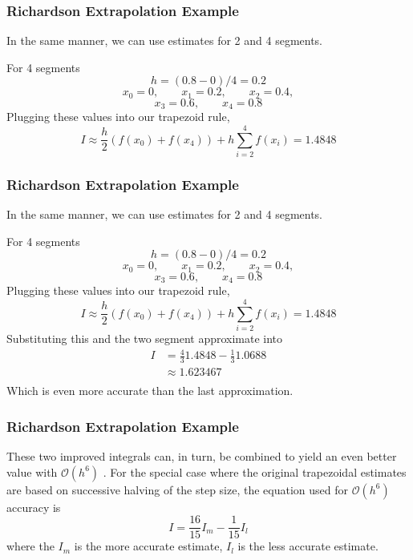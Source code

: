 \documentclass{if-beamer}
\begin{document}
\begin{frame}[t]
	\frametitle{Richardson Extrapolation Example}
	
	In the same manner, we can use estimates for 2 and 4 segments. \\\vspace{10pt}
	
	For 4 segments
	$$ h = (0.8-0)/4 = 0.2$$
	$$ x_0 = 0, \qquad x_1 = 0.2, \qquad x_2 = 0.4,$$
	$$ x_3 = 0.6, \qquad x_4 =0.8 $$
	Plugging these values into our trapezoid rule, 
	$$ I \approx \frac{h}{2}(f(x_0)+f(x_4)) + h\sum_{i=2}^{4} f(x_i) = 1.4848$$

\end{frame}

\begin{frame}[t]
	\frametitle{Richardson Extrapolation Example}
	
	In the same manner, we can use estimates for 2 and 4 segments. \\\vspace{10pt}
	
	For 4 segments
	$$ h = (0.8-0)/4 = 0.2$$
	$$ x_0 = 0, \qquad x_1 = 0.2, \qquad x_2 = 0.4,$$
	$$ x_3 = 0.6, \qquad x_4 =0.8 $$
	Plugging these values into our trapezoid rule, 
	$$ I \approx \frac{h}{2}(f(x_0)+f(x_4)) + h\sum_{i=2}^{4} f(x_i) = 1.4848$$
	Substituting this and the two segment approximate into 
	\begin{align*}
	I &=\frac{4}{3}1.4848-\frac{1}{3}1.0688\\
	&\approx 1.623467\\
	\end{align*}
	Which is even more accurate than the last approximation.
\end{frame}

\begin{frame}[t]
	\frametitle{Richardson Extrapolation Example}
	These two improved integrals can, in turn, be combined to yield an
	even better value with $\mathcal{O}(h^6)$ . For the special case where the original trapezoidal estimates
	are based on successive halving of the step size, the equation used for $\mathcal{O}(h^6)$ accuracy is
	$$ I = \frac{16}{15}I_m -\frac{1}{15}I_l$$
	where the $I_m$ is the more accurate estimate, $I_l$ is the less accurate estimate. \\\vspace{10pt}
\end{frame}
\end{document}
